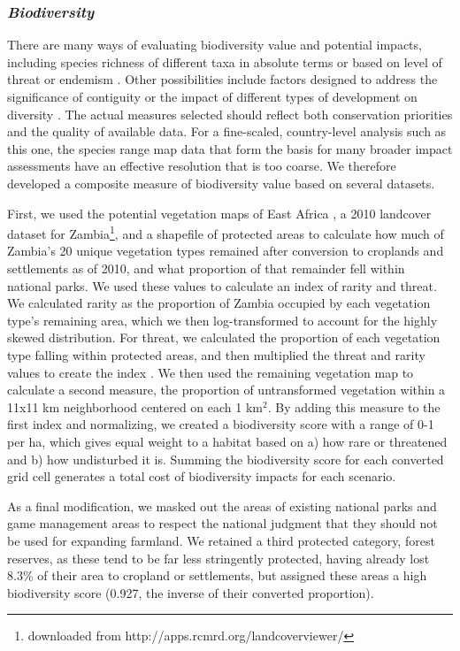 \documentclass[a4paper]{article}
\begin{document}
{\subsubsection*{\emph{Biodiversity}}

There are many ways of evaluating biodiversity value and potential impacts, including species richness of different taxa in absolute terms or based on level of threat or endemism \citep[e.g.][]{searchinger_high_2015, gasparri_emerging_2015}. Other possibilities include factors designed to address the significance of contiguity or the impact of different types of development on diversity \citep[e.g.][]{newbold_global_2015,koh_spatially_2010}.  The actual measures selected should reflect both conservation priorities and the quality of available data.  For a fine-scaled, country-level analysis such as this one, the species range map data that form the basis for many broader impact assessments \citep[e.g.][]{kehoe_global_2015} have an effective resolution that is too coarse. We therefore developed a composite measure of biodiversity value based on several datasets. 

First, we used the potential vegetation maps of East Africa \citep[][]{van_breugel_potential_2011}, a 2010 landcover dataset for Zambia\footnote{downloaded from http://apps.rcmrd.org/landcoverviewer/}, and a shapefile of protected areas to calculate how much of Zambia's 20 unique vegetation types remained after conversion to croplands and settlements as of 2010, and what proportion of that remainder fell within national parks. We used these values to calculate an index of rarity and threat. We calculated rarity as the proportion of Zambia occupied by each vegetation type's remaining area, which we then log-transformed to account for the highly skewed distribution. For threat, we calculated the proportion of each vegetation type falling within protected areas, and then multiplied the threat and rarity values to create the index \citep{van_breugel_environmental_2015}. We then used the remaining vegetation map to calculate a second measure, the proportion of untransformed vegetation within a 11x11 km neighborhood centered on each 1 km$^2$. By adding this measure to the first index and normalizing, we created a biodiversity score with a range of 0-1 per ha, which gives equal weight to a habitat based on a) how rare or threatened and b) how undisturbed it is.  Summing the biodiversity score for each converted grid cell generates a total cost of biodiversity impacts for each scenario.  

As a final modification, we masked out the areas of existing national parks and game management areas to respect the national judgment that they should not be used for expanding farmland.  We retained a third protected category, forest reserves, as these tend to be far less stringently protected, having already lost 8.3\% of their area to cropland or settlements, but assigned these areas a high biodiversity score (0.927, the inverse of their converted proportion). 

}
\end{document}
